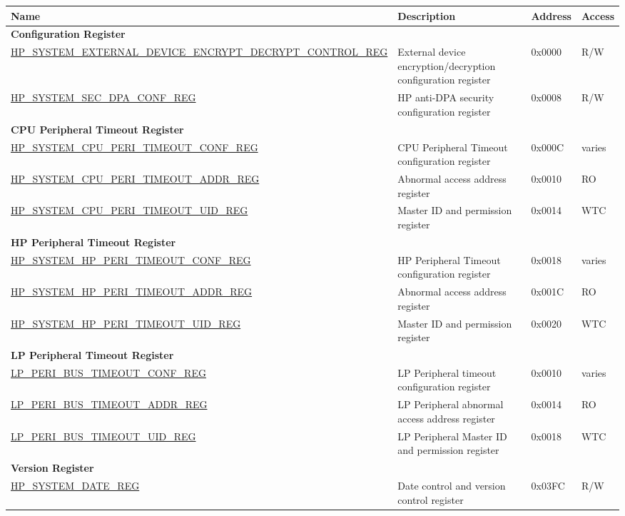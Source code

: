 \begin{longtable}{ | p{12cm} | p{7.2cm} | p{1.3cm} | p{1cm} | }
\hline\rowcolor{lightgray}
Name & Description &  Address & Access \\ \hline
\endhead
\multicolumn{4}{|l|}{\textbf{Configuration Register}} \\ \hline
\hyperref[regdesc:HPSYSTEMEXTERNALDEVICEENCRYPTDECRYPTCONTROLREG]{HP\_SYSTEM\_EXTERNAL\_DEVICE\_ENCRYPT\_DECRYPT\_CONTROL\_REG} & External device encryption/decryption configuration register & 0x0000 & R/W \\ \hline
\hyperref[regdesc:HPSYSTEMSECDPACONFREG]{HP\_SYSTEM\_SEC\_DPA\_CONF\_REG} & HP anti-DPA security configuration register & 0x0008 & R/W \\ \hline
\multicolumn{4}{|l|}{\textbf{CPU Peripheral Timeout Register}} \\ \hline
\hyperref[regdesc:HPSYSTEMCPUPERITIMEOUTCONFREG]{HP\_SYSTEM\_CPU\_PERI\_TIMEOUT\_CONF\_REG} & CPU Peripheral Timeout configuration register & 0x000C & varies \\ \hline
\hyperref[regdesc:HPSYSTEMCPUPERITIMEOUTADDRREG]{HP\_SYSTEM\_CPU\_PERI\_TIMEOUT\_ADDR\_REG} & Abnormal access address register & 0x0010 & RO \\ \hline
\hyperref[regdesc:HPSYSTEMCPUPERITIMEOUTUIDREG]{HP\_SYSTEM\_CPU\_PERI\_TIMEOUT\_UID\_REG} & Master ID and permission register & 0x0014 & WTC \\ \hline
\multicolumn{4}{|l|}{\textbf{HP Peripheral Timeout Register}} \\ \hline
\hyperref[regdesc:HPSYSTEMHPPERITIMEOUTCONFREG]{HP\_SYSTEM\_HP\_PERI\_TIMEOUT\_CONF\_REG} & HP Peripheral Timeout configuration register & 0x0018 & varies \\ \hline
\hyperref[regdesc:HPSYSTEMHPPERITIMEOUTADDRREG]{HP\_SYSTEM\_HP\_PERI\_TIMEOUT\_ADDR\_REG} & Abnormal access address register & 0x001C & RO \\ \hline
\hyperref[regdesc:HPSYSTEMHPPERITIMEOUTUIDREG]{HP\_SYSTEM\_HP\_PERI\_TIMEOUT\_UID\_REG} & Master ID and permission register & 0x0020 & WTC \\ \hline
\multicolumn{4}{|l|}{\textbf{LP Peripheral Timeout Register}} \\ \hline
\hyperref[regdesc:LPPERIBUSTIMEOUTCONFREG]{LP\_PERI\_BUS\_TIMEOUT\_CONF\_REG} & LP Peripheral timeout configuration register & 0x0010 & varies \\ \hline
\hyperref[regdesc:LPPERIBUSTIMEOUTADDRREG]{LP\_PERI\_BUS\_TIMEOUT\_ADDR\_REG} & LP Peripheral  abnormal access address register & 0x0014 & RO \\ \hline
\hyperref[regdesc:LPPERIBUSTIMEOUTUIDREG]{LP\_PERI\_BUS\_TIMEOUT\_UID\_REG} & LP Peripheral Master ID and permission register & 0x0018 & WTC \\ \hline
\multicolumn{4}{|l|}{\textbf{Version Register}} \\ \hline
\hyperref[regdesc:HPSYSTEMDATEREG]{HP\_SYSTEM\_DATE\_REG} & Date control and version control register & 0x03FC & R/W \\ \hline
\end{longtable}
